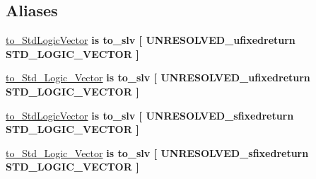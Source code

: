 \subsection*{Aliases}
 \begin{DoxyCompactItemize}
\item 
\hyperlink{classfixed__pkg_a110cd33414e205a8db1672725c3a619d}{to\+\_\+\+Std\+Logic\+Vector}  {\bfseries {\bfseries \textcolor{keywordflow}{is}\textcolor{vhdlchar}{ }\textcolor{vhdlchar}{to\+\_\+slv}\textcolor{vhdlchar}{ }\textcolor{vhdlchar}{\mbox{[}}\textcolor{vhdlchar}{ }\textcolor{vhdlchar}{U\+N\+R\+E\+S\+O\+L\+V\+E\+D\+\_\+ufixedreturn}\textcolor{vhdlchar}{ }\textcolor{comment}{S\+T\+D\+\_\+\+L\+O\+G\+I\+C\+\_\+\+V\+E\+C\+T\+O\+R}\textcolor{vhdlchar}{ }\textcolor{vhdlchar}{\mbox{]}}\textcolor{vhdlchar}{ }}} {\bfseries \textcolor{vhdlchar}{ }} 
\item 
\hyperlink{classfixed__pkg_ac842574fa2c1d7cc99e5c19d6fa0f813}{to\+\_\+\+Std\+\_\+\+Logic\+\_\+\+Vector}  {\bfseries {\bfseries \textcolor{keywordflow}{is}\textcolor{vhdlchar}{ }\textcolor{vhdlchar}{to\+\_\+slv}\textcolor{vhdlchar}{ }\textcolor{vhdlchar}{\mbox{[}}\textcolor{vhdlchar}{ }\textcolor{vhdlchar}{U\+N\+R\+E\+S\+O\+L\+V\+E\+D\+\_\+ufixedreturn}\textcolor{vhdlchar}{ }\textcolor{comment}{S\+T\+D\+\_\+\+L\+O\+G\+I\+C\+\_\+\+V\+E\+C\+T\+O\+R}\textcolor{vhdlchar}{ }\textcolor{vhdlchar}{\mbox{]}}\textcolor{vhdlchar}{ }}} {\bfseries \textcolor{vhdlchar}{ }} 
\item 
\hyperlink{classfixed__pkg_a5589ad5c9ba2fa258223f7684636c5a5}{to\+\_\+\+Std\+Logic\+Vector}  {\bfseries {\bfseries \textcolor{keywordflow}{is}\textcolor{vhdlchar}{ }\textcolor{vhdlchar}{to\+\_\+slv}\textcolor{vhdlchar}{ }\textcolor{vhdlchar}{\mbox{[}}\textcolor{vhdlchar}{ }\textcolor{vhdlchar}{U\+N\+R\+E\+S\+O\+L\+V\+E\+D\+\_\+sfixedreturn}\textcolor{vhdlchar}{ }\textcolor{comment}{S\+T\+D\+\_\+\+L\+O\+G\+I\+C\+\_\+\+V\+E\+C\+T\+O\+R}\textcolor{vhdlchar}{ }\textcolor{vhdlchar}{\mbox{]}}\textcolor{vhdlchar}{ }}} {\bfseries \textcolor{vhdlchar}{ }} 
\item 
\hyperlink{classfixed__pkg_a3e2f78adea244aac574e18c606ae222e}{to\+\_\+\+Std\+\_\+\+Logic\+\_\+\+Vector}  {\bfseries {\bfseries \textcolor{keywordflow}{is}\textcolor{vhdlchar}{ }\textcolor{vhdlchar}{to\+\_\+slv}\textcolor{vhdlchar}{ }\textcolor{vhdlchar}{\mbox{[}}\textcolor{vhdlchar}{ }\textcolor{vhdlchar}{U\+N\+R\+E\+S\+O\+L\+V\+E\+D\+\_\+sfixedreturn}\textcolor{vhdlchar}{ }\textcolor{comment}{S\+T\+D\+\_\+\+L\+O\+G\+I\+C\+\_\+\+V\+E\+C\+T\+O\+R}\textcolor{vhdlchar}{ }\textcolor{vhdlchar}{\mbox{]}}\textcolor{vhdlchar}{ }}} {\bfseries \textcolor{vhdlchar}{ }} 

\end{DoxyCompactItemize}

